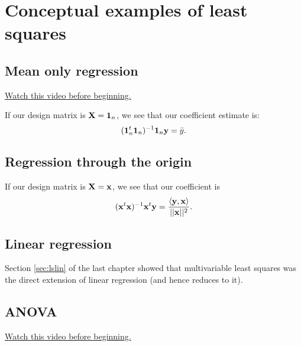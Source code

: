 \chapter{Conceptual examples of least squares}

\section{Mean only regression}
\href{https://www.youtube.com/watch?v=OSfPvU1Tq0k&index=28&list=PLpl-gQkQivXhdgUCdaUQcdb31CRe8Mm2y}{Watch this video before beginning.}

If our design matrix is $\mathbf{X} = \mathbf{1}_n$, we see 
that our coefficient estimate is:
$$
(\mathbf{1}_n ^t \mathbf{1}_n)^{-1} \mathbf{1}_n \mathbf{y} = \bar y.
$$

\section{Regression through the origin}
If our design matrix is $\mathbf{X} = \mathbf{x}$, we see
that our coefficient is 
$$
(\mathbf{x}^t\mathbf{x})^{-1}\mathbf{x}^t \mathbf{y}
= \frac{\langle \mathbf{y}, \mathbf{x} \rangle}{||\mathbf{x}||^2}.
$$

\section{Linear regression}
Section \ref{sec:lslin} of the last chapter showed
that multivariable least squares was the direct
extension of linear regression (and hence reduces
to it).

\section{ANOVA}
\href{https://www.youtube.com/watch?v=3rPoBwGPKAM&list=PLpl-gQkQivXhdgUCdaUQcdb31CRe8Mm2y&index=29}{Watch this video before beginning.}

